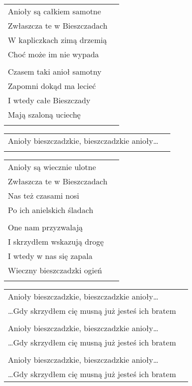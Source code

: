 \documentclass[a5paper]{article}
\begin{document}
\noindent
\begin{tabular}{@{}p{9cm}p{3cm}@{}}
Anioły są całkiem samotne \\
Zwłaszcza te w Bieszczadach \\      
W kapliczkach zimą drzemią \\        
Choć może im nie wypada \\ \\              
 
Czasem taki anioł samotny \\                        
Zapomni dokąd ma lecieć \\           
I wtedy całe Bieszczady \\                 
Mają szaloną uciechę \\ \\   
\end{tabular}

\noindent
\begin{tabular}{@{}p{8.5cm}p{3cm}@{}}
Anioły bieszczadzkie, bieszczadzkie anioły… \\ \\
\end{tabular}

\noindent
\begin{tabular}{@{}p{9.5cm}p{3cm}@{}} 
Anioły są wiecznie ulotne \\
Zwłaszcza te w Bieszczadach \\
Nas też czasami nosi \\
Po ich anielskich śladach \\ \\
 
One nam przyzwalają \\
I skrzydłem wskazują drogę \\
I wtedy w nas się zapala \\
Wieczny bieszczadzki ogień \\ \\
\end{tabular}

\noindent
\begin{tabular}{@{}p{8.5cm}p{3cm}@{}} 
Anioły bieszczadzkie, bieszczadzkie anioły… \\
…Gdy skrzydłem cię musną już jesteś ich bratem \\ \\
 
Anioły bieszczadzkie, bieszczadzkie anioły… \\
…Gdy skrzydłem cię musną już jesteś ich bratem  \\ \\
 
Anioły bieszczadzkie, bieszczadzkie anioły… \\
…Gdy skrzydłem cię musną już jesteś ich bratem
\end{tabular}
\end{document}
